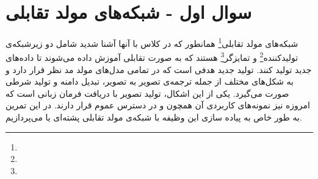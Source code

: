 \section{سوال اول - شبکه‌های مولد تقابلی}
شبکه‌های مولد تقابلی\footnote{} همانطور که در کلاس با آنها آشنا شدید شامل دو زیرشبکه‌ی تولیدکننده\footnote{} و تمایزگر\footnote{} هستند که به صورت تقابلی آموزش داده می‌شوند تا داده‌های جدید تولید کنند. تولید جدید هدفی است که در تمامی مدل‌های مولد مد نظر قرار دارد و به شکل‌های مختلف از جمله ترجمه‌ی تصویر به تصویر، تبدیل دامنه و تولید شرطی صورت می‌گیرد. یکی از این اشکال، تولید تصویر با دریافت فرمان زبانی است که امروزه نیز نمونه‌های کاربردی آن همچون  و  در دسترس عموم قرار دارند. در این تمرین به طور خاص به پیاده سازی این وظیفه با شبکه‌ی مولد تقابلی پشته‌ای یا  می‌پردازیم.



